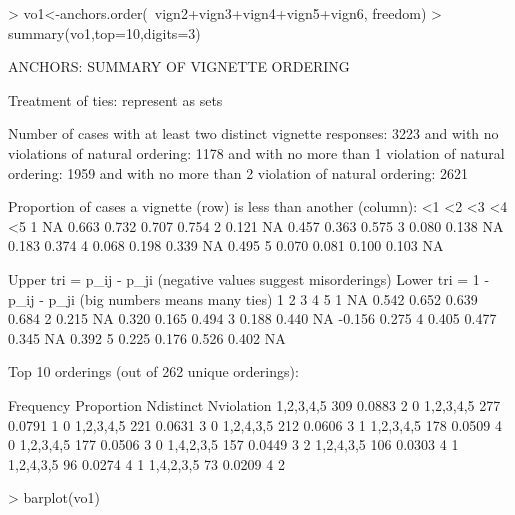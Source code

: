 \documentclass{amsart}
\begin{document}
\begin{Schunk}
\begin{Sinput}
> vo1<-anchors.order(~vign2+vign3+vign4+vign5+vign6, freedom)
> summary(vo1,top=10,digits=3)
\end{Sinput}
\begin{Soutput}
ANCHORS: SUMMARY OF VIGNETTE ORDERING

Treatment of ties: represent as sets 

Number of cases with at least two distinct vignette responses: 3223 
and with no violations of natural ordering: 1178 
and with no more than 1 violation of natural ordering: 1959 
and with no more than 2 violation of natural ordering: 2621 

Proportion of cases a vignette (row) is less than another (column):
     <1    <2    <3    <4    <5
1    NA 0.663 0.732 0.707 0.754
2 0.121    NA 0.457 0.363 0.575
3 0.080 0.138    NA 0.183 0.374
4 0.068 0.198 0.339    NA 0.495
5 0.070 0.081 0.100 0.103    NA

Upper tri =     p_{ij} - p_{ji} (negative values suggest misorderings)
Lower tri = 1 - p_{ij} - p_{ji} (big numbers means many ties)
      1     2     3      4     5
1    NA 0.542 0.652  0.639 0.684
2 0.215    NA 0.320  0.165 0.494
3 0.188 0.440    NA -0.156 0.275
4 0.405 0.477 0.345     NA 0.392
5 0.225 0.176 0.526  0.402    NA

Top 10 orderings (out of 262 unique orderings):

              Frequency Proportion Ndistinct Nviolation
1,{2,3,4,5}         309     0.0883         2          0
{1,2,3,4,5}         277     0.0791         1          0
1,2,{3,4,5}         221     0.0631         3          0
1,{2,4},{3,5}       212     0.0606         3          1
1,2,{3,4},5         178     0.0509         4          0
1,{2,3,4},5         177     0.0506         3          0
1,4,{2,3,5}         157     0.0449         3          2
1,2,4,{3,5}         106     0.0303         4          1
1,{2,4},3,5          96     0.0274         4          1
1,4,2,{3,5}          73     0.0209         4          2
\end{Soutput}
\begin{Sinput}
> barplot(vo1)
\end{Sinput}
\end{Schunk}
\end{document}
